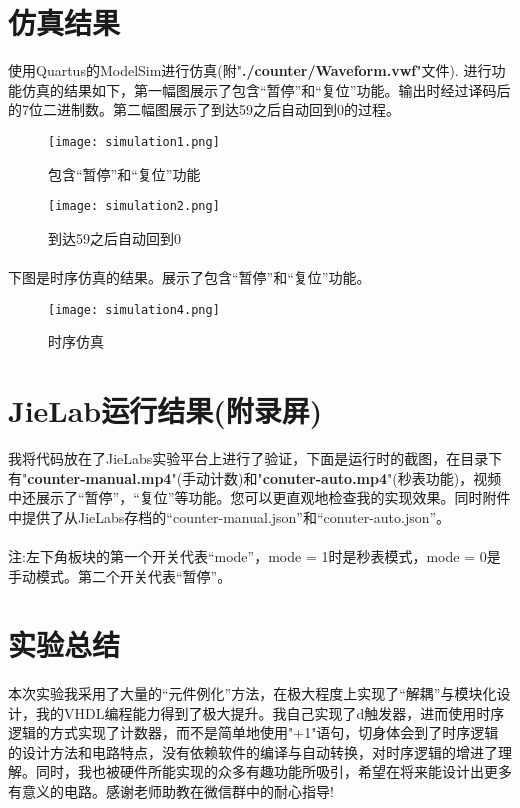 \documentclass[UTF8, onecolumn, a4paper]{article}
\begin{document}
\section{仿真结果}
使用Quartus的ModelSim进行仿真(附"\textbf{./counter/Waveform.vwf}"文件).
进行功能仿真的结果如下，第一幅图展示了包含“暂停”和“复位”功能。输出时经过译码后的7位二进制数。第二幅图展示了到达59之后自动回到0的过程。
\begin{figure}[htb]
	\centering
	\texttt{[image: simulation1.png]}
	\caption{包含“暂停”和“复位”功能}
\end{figure}
\begin{figure}[htb]
	\centering
	\texttt{[image: simulation2.png]}
	\caption{到达59之后自动回到0}
\end{figure}
\clearpage
\paragraph*{}
下图是时序仿真的结果。展示了包含“暂停”和“复位”功能。
\begin{figure}[htb]
	\centering
	\texttt{[image: simulation4.png]}
	\caption{时序仿真}
\end{figure}
\section{JieLab运行结果(附录屏)}
我将代码放在了JieLabs实验平台上进行了验证，下面是运行时的截图，在目录下有"\textbf{counter-manual.mp4}"(手动计数)和"\textbf{conuter-auto.mp4}"(秒表功能)，视频中还展示了“暂停”，“复位”等功能。您可以更直观地检查我的实现效果。同时附件中提供了从JieLabs存档的“counter-manual.json”和“conuter-auto.json”。
\paragraph*{}
注:左下角板块的第一个开关代表“mode”，mode = 1时是秒表模式，mode = 0是手动模式。第二个开关代表“暂停”。
\begin{figure}[htb]
	\centering
\end{figure}
\section{实验总结}
\paragraph*{}
本次实验我采用了大量的“元件例化”方法，在极大程度上实现了“解耦”与模块化设计，我的VHDL编程能力得到了极大提升。我自己实现了d触发器，进而使用时序逻辑的方式实现了计数器，而不是简单地使用"+1"语句，切身体会到了时序逻辑的设计方法和电路特点，没有依赖软件的编译与自动转换，对时序逻辑的增进了理解。同时，我也被硬件所能实现的众多有趣功能所吸引，希望在将来能设计出更多有意义的电路。感谢老师助教在微信群中的耐心指导!
\end{document}
